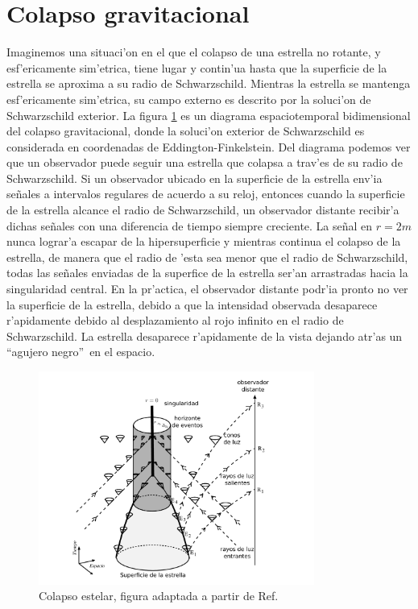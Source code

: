 \section{Colapso gravitacional}

%
 Imaginemos una situaci'on en el que el colapso de una estrella no rotante, y esf'ericamente sim'etrica, tiene lugar y contin'ua hasta que la superficie de la estrella se aproxima a su radio de Schwarzschild. Mientras la estrella se mantenga esf'ericamente sim'etrica, su campo externo es descrito por la soluci'on de Schwarzschild exterior. La figura \ref{fig:colapso} es un diagrama  espaciotemporal bidimensional del colapso gravitacional, donde la soluci'on exterior de Schwarzschild es considerada en coordenadas de Eddington-Finkelstein. Del diagrama podemos ver que un observador puede seguir una estrella que colapsa a trav'es de su radio de Schwarzschild. Si un observador ubicado en la superficie de la estrella env'ia se\~nales a intervalos regulares de acuerdo a su reloj, entonces cuando la superficie de la estrella alcance el radio de Schwarzschild, un observador distante recibir'a dichas se\~nales con una diferencia de tiempo siempre creciente. La se\~nal en $r=2m$ nunca lograr'a escapar de la hipersuperficie y mientras continua el colapso de la estrella, de manera que el radio de 'esta sea menor que el radio de Schwarzschild, todas las se\~nales enviadas de la superfice de la estrella ser'an arrastradas hacia la singularidad central. En la pr'actica, el observador distante podr'ia pronto no ver la superficie de la estrella, debido a que la intensidad observada desaparece r'apidamente debido al desplazamiento al rojo infinito en el radio de Schwarzschild. La estrella desaparece r'apidamente de la vista dejando atr'as un ``agujero negro''\, en el espacio.

\begin{figure}[H]
\begin{center}
\includegraphics[height=7cm]{fig/fig-colapso.pdf}
\caption{Colapso estelar, figura adaptada a partir de Ref. \cite{Luminet98}}
\label{fig:colapso}
\end{center}
\end{figure}